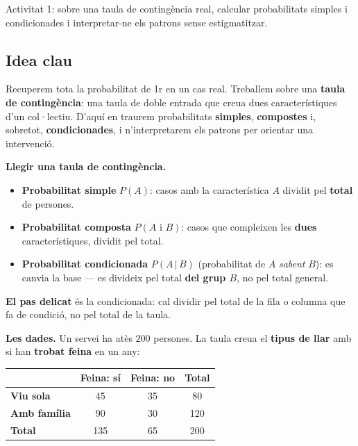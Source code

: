 %
{Activitat 1: sobre una taula de contingència real, calcular probabilitats simples i condicionades i interpretar-ne els patrons sense estigmatitzar.}

\subsection{Idea clau}

Recuperem tota la probabilitat de 1r en un cas real. Treballem sobre una \textbf{taula de
contingència}: una taula de doble entrada que creua dues característiques d'un col·lectiu.
D'aquí en traurem probabilitats \textbf{simples}, \textbf{compostes} i, sobretot,
\textbf{condicionades}, i n'interpretarem els patrons per orientar una intervenció.

\begin{idea}
\textbf{Llegir una taula de contingència.}
\begin{itemize}[leftmargin=1.4em, itemsep=3pt]
  \item \textbf{Probabilitat simple} $P(A)$: casos amb la característica $A$ dividit pel
        \textbf{total} de persones.
  \item \textbf{Probabilitat composta} $P(A\text{ i }B)$: casos que compleixen les
        \textbf{dues} característiques, dividit pel total.
  \item \textbf{Probabilitat condicionada} $P(A\,|\,B)$ (probabilitat de $A$
        \emph{sabent} $B$): es canvia la base — es divideix pel total \textbf{del grup
        $B$}, no pel total general.
\end{itemize}
\textbf{El pas delicat} és la condicionada: cal dividir pel total de la fila o columna que
fa de condició, no pel total de la taula.
\end{idea}

\noindent\textbf{Les dades.} Un servei ha atès $200$ persones. La taula creua el
\textbf{tipus de llar} amb si han \textbf{trobat feina} en un any:
\begin{center}
\renewcommand{\arraystretch}{1.3}
\begin{tabular}{l c c c}
\toprule
 & \textbf{Feina: sí} & \textbf{Feina: no} & \textbf{Total} \\
\midrule
\textbf{Viu sola}     & 45  & 35 & 80 \\
\textbf{Amb família}  & 90  & 30 & 120 \\
\midrule
\textbf{Total}        & 135 & 65 & 200 \\
\bottomrule
\end{tabular}
\end{center}

